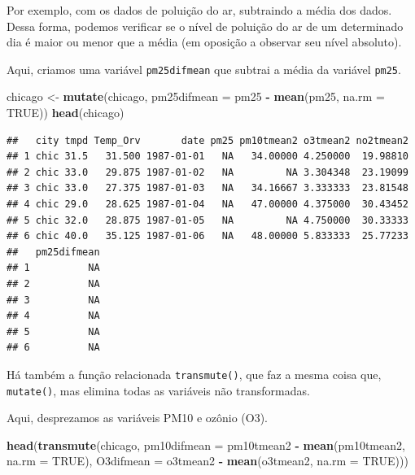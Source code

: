 \documentclass[]{book}
\newenvironment{Shaded}{\begin{snugshade}}{\end{snugshade}}
\newcommand{\DataTypeTok}[1]{\textcolor[rgb]{0.13,0.29,0.53}{#1}}
\newcommand{\KeywordTok}[1]{\textcolor[rgb]{0.13,0.29,0.53}{\textbf{#1}}}
\newcommand{\NormalTok}[1]{#1}
\newcommand{\OperatorTok}[1]{\textcolor[rgb]{0.81,0.36,0.00}{\textbf{#1}}}
\newcommand{\OtherTok}[1]{\textcolor[rgb]{0.56,0.35,0.01}{#1}}
\newcommand{\StringTok}[1]{\textcolor[rgb]{0.31,0.60,0.02}{#1}}
\begin{document}
Por exemplo, com os dados de poluição do ar, subtraindo a média dos dados. Dessa forma, podemos verificar se o nível de poluição do ar de um determinado dia é maior ou menor que a média (em oposição a observar seu nível absoluto).

Aqui, criamos uma variável \texttt{pm25difmean} que subtrai a média da variável \texttt{pm25}.

\begin{Shaded}
\begin{Highlighting}[]
\NormalTok{chicago <-}\StringTok{ }\KeywordTok{mutate}\NormalTok{(chicago, }\DataTypeTok{pm25difmean =}\NormalTok{ pm25 }\OperatorTok{-}\StringTok{ }\KeywordTok{mean}\NormalTok{(pm25, }\DataTypeTok{na.rm =} \OtherTok{TRUE}\NormalTok{))}
\KeywordTok{head}\NormalTok{(chicago)}
\end{Highlighting}
\end{Shaded}

\begin{verbatim}
##   city tmpd Temp_Orv       date pm25 pm10tmean2 o3tmean2 no2tmean2
## 1 chic 31.5   31.500 1987-01-01   NA   34.00000 4.250000  19.98810
## 2 chic 33.0   29.875 1987-01-02   NA         NA 3.304348  23.19099
## 3 chic 33.0   27.375 1987-01-03   NA   34.16667 3.333333  23.81548
## 4 chic 29.0   28.625 1987-01-04   NA   47.00000 4.375000  30.43452
## 5 chic 32.0   28.875 1987-01-05   NA         NA 4.750000  30.33333
## 6 chic 40.0   35.125 1987-01-06   NA   48.00000 5.833333  25.77233
##   pm25difmean
## 1          NA
## 2          NA
## 3          NA
## 4          NA
## 5          NA
## 6          NA
\end{verbatim}

Há também a função relacionada \texttt{transmute()}, que faz a mesma coisa que, \texttt{mutate()}, mas elimina todas as variáveis não transformadas.

Aqui, desprezamos as variáveis PM10 e ozônio (O3).

\begin{Shaded}
\begin{Highlighting}[]
\KeywordTok{head}\NormalTok{(}\KeywordTok{transmute}\NormalTok{(chicago, }
               \DataTypeTok{pm10difmean =}\NormalTok{ pm10tmean2 }\OperatorTok{-}\StringTok{ }\KeywordTok{mean}\NormalTok{(pm10tmean2, }\DataTypeTok{na.rm =} \OtherTok{TRUE}\NormalTok{),}
               \DataTypeTok{O3difmean =}\NormalTok{ o3tmean2 }\OperatorTok{-}\StringTok{ }\KeywordTok{mean}\NormalTok{(o3tmean2, }\DataTypeTok{na.rm =} \OtherTok{TRUE}\NormalTok{)))}
\end{Highlighting}
\end{Shaded}
\end{document}
